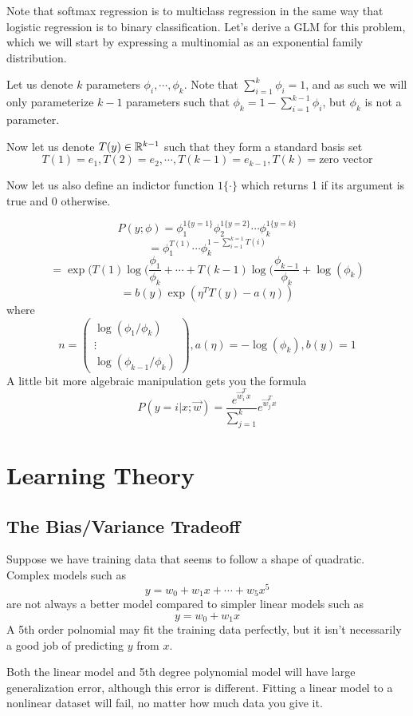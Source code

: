 \documentclass[12pt]{scrartcl}
\begin{document}
Note that softmax regression is to multiclass regression in the same way that logistic regression is to binary classification. Let's derive a GLM for this problem, which we will start by expressing a multinomial as an exponential family distribution.

Let us denote $k$ parameters $\phi_i, \cdots, \phi_k$. Note that $\sum_{i=1}^k \phi_i = 1$, and as such we will only parameterize $k-1$ parameters such that $\phi_k = 1 - \sum_{i=1}^{k-1}\phi_i$, but $\phi_k$ is not a parameter.

Now let us denote $T(y) \in \mathbb R^{k-1}$ such that they form a standard basis set
\[T(1) = e_1, T(2) = e_2, \cdots ,T(k-1) = e_{k-1}, T(k) = \text{zero vector}\]

Now let us also define an indictor function $1\{\cdot\}$ which returns 1 if its argument is true and 0 otherwise.

\[P(y; \phi) = \phi_1^{1\{y=1\}}\phi_2^{1\{y=2\}}\cdots\phi_k^{1\{y=k\}}\]
\[= \phi_1^{T(1)}\cdots\phi_k^{1-\sum_{i=1}^{k=1}T(i)}\]
\[= \exp(T(1)\log(\frac{\phi_1}{\phi_k} + \cdots + T(k-1)\log(\frac{\phi_{k-1}}{\phi_k} + \log(\phi_k)\]
\[= b(y)\exp(\eta^TT(y) - a(\eta))\]
where 
\[n = \begin{pmatrix}
    \log(\phi_1/\phi_k)\\
    \vdots\\
    \log(\phi_{k-1}/\phi_k)
\end{pmatrix}, a(\eta) = -\log(\phi_k), b(y) = 1\]
A little bit more algebraic manipulation gets you the formula
\[P(y=i| x;\vec{w}) = \frac{e^{\vec{w}_i^Tx}}{\sum_{j=1}^k}e^{\vec{w}_j^Tx}\]

\section{Learning Theory}

\subsection{The Bias/Variance Tradeoff}

Suppose we have training data that seems to follow a shape of quadratic. Complex models such as 
\[y = w_0 + w_1x + \cdots + w_5x^5\]
are not always a better model compared to simpler linear models such as 
\[y = w_0 + w_1x\]
A 5th order polnomial may fit the training data perfectly, but it isn't necessarily a good job of predicting $y$ from $x$.

\begin{note}
    Both the linear model and 5th degree polynomial model will have large generalization error, although this error is different. Fitting a linear model to a nonlinear dataset will fail, no matter how much data you give it.
\end{note}
\end{document}
